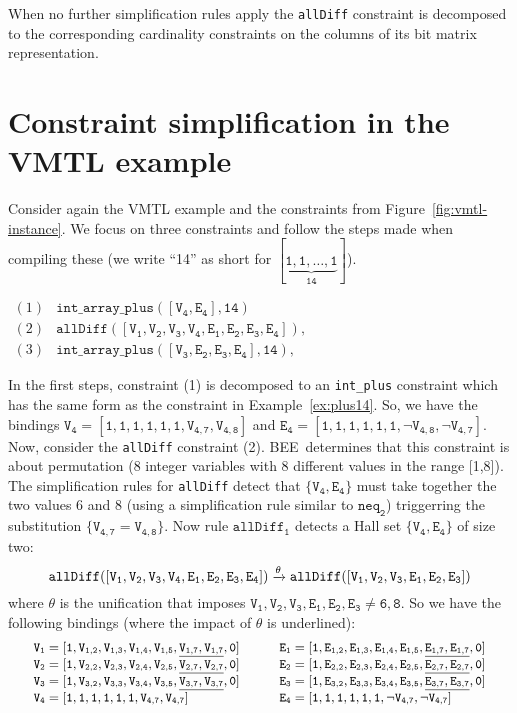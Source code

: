 \documentclass{tlp}
\newcommand{\bee}{\textsf{BEE}}
\begin{document}
When no further simplification rules apply the \texttt{allDiff}
constraint is decomposed to the corresponding cardinality constraints
on the columns of its bit matrix representation.



\section{Constraint simplification in the VMTL example}

Consider again the VMTL example and the constraints from
Figure~\ref{fig:vmtl-instance}. We focus on three
constraints and follow the steps made when compiling these (we write
``14'' as short for $\mathtt{[\underbrace{1,1,\ldots,1}_{14}]}$). 

\smallskip
$\begin{array}{ll}
(1) & \mathtt{int\_array\_plus([V_4,E_4], 14)} \\
(2) & \mathtt{allDiff([V_1,V_2,V_3,V_4,E_1,E_2,E_3,E_4]),} \\
(3) & \mathtt{int\_array\_plus([V_3,E_2,E_3,E_4], 14),} 
\end{array}$

\smallskip\noindent In the first steps, constraint (1) is decomposed to
an \texttt{int\_plus} constraint which has the same form as the
constraint in Example~\ref{ex:plus14}. So, we have the bindings
$\mathtt{V_4 = [1,1,1,1,1,1,V_{4,7}, V_{4,8}]}$ and
$\mathtt{E_4 = [1,1,1,1,1,1,\neg V_{4,8},\neg V_{4,7}]}$. 
Now, consider the \texttt{allDiff} constraint (2). \bee\ determines
that this constraint is about permutation (8 integer variables with 8
different values in the range [1,8]). The simplification rules for
\texttt{allDiff} detect that $\mathtt{\{V_4,E_4\}}$ must take together
the two values 6 and 8 (using a simplification rule similar to
$\mathtt{neq_2}$) triggerring the substitution $\mathtt{\{V_{4,7} =
  V_{4,8}\}}$.  Now rule $\mathtt{allDiff_1}$ detects a Hall set
$\mathtt{\{V_4,E_4\}}$ of size two:
\[\small \mathtt{allDiff([V_1,V_2,V_3,V_4,E_1,E_2,E_3,E_4])}
\xrightarrow{\theta} 
\mathtt{allDiff([V_1,V_2,V_3,E_1,E_2,E_3])}
\]
where $\theta$ is the unification that imposes
$\mathtt{V_1,V_2,V_3,E_1,E_2,E_3 \neq 6,8}$. So we have the following
bindings (where the impact of $\theta$ is underlined): 
\[\small \begin{array}{ll}
\mathtt{V_{1}=
   [1,V_{1,2},V_{1,3},V_{1,4},V_{1,5},\underline{V_{1,7},V_{1,7}},0]} \qquad&
\mathtt{E_{1}=
   [1,E_{1,2},E_{1,3},E_{1,4},E_{1,5},\underline{E_{1,7},E_{1,7}},0]} \\
\mathtt{V_{2}=
   [1,V_{2,2},V_{2,3},V_{2,4},V_{2,5},\underline{V_{2,7},V_{2,7}},0]} &
\mathtt{E_{2}=
   [1,E_{2,2},E_{2,3},E_{2,4},E_{2,5},\underline{E_{2,7},E_{2,7}},0]} \\
\mathtt{V_{3}=
   [1,V_{3,2},V_{3,3},V_{3,4},V_{3,5},\underline{V_{3,7},V_{3,7}},0]} &
\mathtt{E_{3}=
   [1,E_{3,2},E_{3,3},E_{3,4},E_{3,5},\underline{E_{3,7},E_{3,7}},0]} \\
\mathtt{V_{4}=
   [1,1,1,1,1,1,V_{4,7},V_{4,7}]} & 
\mathtt{E_{4}=
   [1,1,1,1,1,1,\neg V_{4,7},\neg V_{4,7}]}
\end{array}  
\]
\end{document}
